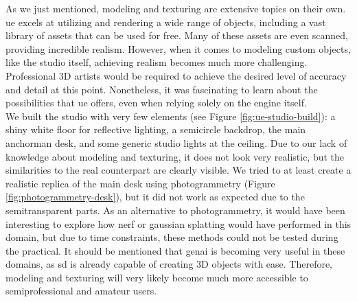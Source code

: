 \documentclass[
  a4paper,  %
  twoside,  %
  bibliography=totoc,
  headsepline,
  cleardoublepage=empty,
  parskip=half,
  draft=false
]{scrbook}
\begin{document}
As we just mentioned, modeling and texturing are extensive topics on their own. \gls{ue} excels at utilizing and rendering a wide range of objects, including a vast library of assets that can be used for free. Many of these assets are even scanned, providing incredible realism. However, when it comes to modeling custom objects, like the studio itself, achieving realism becomes much more challenging. Professional 3D artists would be required to achieve the desired level of accuracy and detail at this point. Nonetheless, it was fascinating to learn about the possibilities that \gls{ue} offers, even when relying solely on the engine itself. \\
We built the studio with very few elements (see Figure \ref{fig:ue-studio-build}): a shiny white floor for reflective lighting, a semicircle backdrop, the main anchorman desk, and some generic studio lights at the ceiling. Due to our lack of knowledge about modeling and texturing, it does not look very realistic, but the similarities to the real counterpart are clearly visible. We tried to at least create a realistic replica of the main desk using photogrammetry (Figure \ref{fig:photogrammetry-desk}), but it did not work as expected due to the semitransparent parts. As an alternative to photogrammetry, it would have been interesting to explore how \gls{nerf} or gaussian splatting would have performed in this domain, but due to time constraints, these methods could not be tested during the practical. It should be mentioned that \gls{genai} is becoming very useful in these domains, as \gls{sd} is already capable of creating 3D objects with ease. Therefore, modeling and texturing will very likely become much more accessible to semiprofessional and amateur users.
\end{document}
